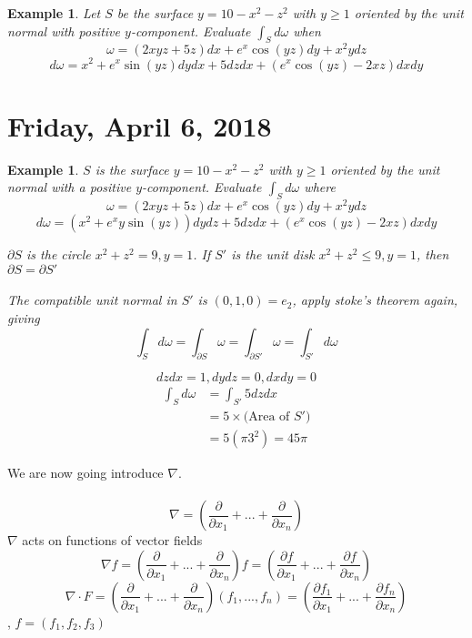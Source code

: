 \documentclass[12pt]{article}
\theoremstyle{plain}
\newtheorem{example}[theorem]{Example}
\theoremstyle{definition}
\begin{document}
\begin{example}
	Let $S$ be the surface $y=10-x^2-z^2$ with $y\geq 1$ oriented by the unit normal with positive $y$-component. Evaluate $\int_S d\omega$ when $$\omega = (2xyz+5z)dx + e^x \cos (yz) dy + x^2y dz$$
	$$d\omega = x^2 +e^x \sin (yz) dydx + 5dzdx + (e^x \cos (yz) - 2xz)dxdy$$
\end{example}

\newpage

\section{Friday, April 6, 2018}

\begin{example}
	$S$ is the surface $y=10-x^2-z^2$ with $y\geq 1$ oriented by the unit normal with a positive $y$-component. Evaluate $\int_S d\omega$ where $$\omega = (2xyz+5z)dx + e^x \cos(yz)dy + x^2ydz$$
	$$d\omega = (x^2 +e^x y \sin(yz))dydz + 5dzdx + (e^x \cos(yz) - 2xz)dxdy$$

	$\partial S$ is the circle $x^2 + z^2 = 9, y = 1$. If $S'$ is the unit disk $x^2 + z^2 \leq 9, y = 1$, then $\partial S = \partial S'$\\
	\\
	The compatible unit normal in $S'$ is $(0,1,0) = e_2$, apply stoke's theorem again, giving
	$$\int_S d\omega = \int_{\partial S} \omega = \int_{\partial S'} \omega = \int_{S'} d\omega$$

	$$dzdx = 1, dydz = 0, dxdy = 0$$
	\begin{align*}
		\int_S d\omega &= \int_{S'} 5 dzdx\\
		&= 5 \times \text{(Area of $S'$)}\\
		&= 5(\pi3^2) = 45\pi
	\end{align*}
\end{example}

We are now going introduce $\nabla$.\\
\\
$$\nabla = (\frac{\partial}{\partial x_1} + ... + \frac{\partial}{\partial x_n})$$
$\nabla$ acts on functions of vector fields
$$\nabla f = (\frac{\partial}{\partial x_1} + ... + \frac{\partial}{\partial x_n})f = (\frac{\partial f}{\partial x_1} + ... + \frac{\partial f}{\partial x_n}) $$
$$\nabla \cdot F = (\frac{\partial}{\partial x_1} + ... + \frac{\partial}{\partial x_n}) (f_1,...,f_n) = (\frac{\partial f_1}{\partial x_1} + ... + \frac{\partial f_n}{\partial x_n})$$
, $f=(f_1, f_2, f_3)$
\end{document}
